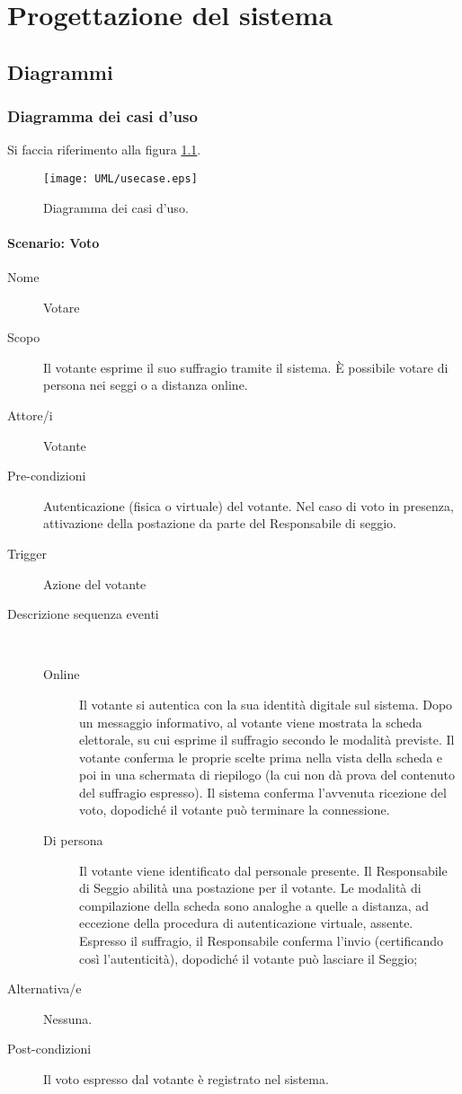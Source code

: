 \chapter{Progettazione del sistema}




\section{Diagrammi}\label{diagrammi}


\subsection{Diagramma dei casi d'uso}
Si faccia riferimento alla figura \ref{fig:usecasediag}.
\begin{figure}[ht]
	\centering
	\texttt{[image: UML/usecase.eps]}
	\caption{Diagramma dei casi d'uso.}
	\label{fig:usecasediag}
\end{figure}


\subsubsection{Scenario: Voto}
\begin{description}
	\item[Nome] Votare
	\item[Scopo] Il votante esprime il suo suffragio tramite il sistema. È possibile votare di persona nei seggi o a distanza online.
	\item[Attore/i] Votante
	\item[Pre-condizioni] Autenticazione (fisica o virtuale) del votante. Nel caso di voto in presenza, attivazione della postazione da parte del Responsabile di seggio.
	\item[Trigger] Azione del votante
	\item[Descrizione sequenza eventi] ~
		\begin{description}
			\item[Online] Il votante si autentica con la sua identità digitale sul sistema. Dopo un messaggio informativo, al votante viene mostrata la scheda elettorale, su cui esprime il suffragio secondo le modalità previste. Il votante conferma le proprie scelte prima nella vista della scheda e poi in una schermata di riepilogo (la cui non dà prova del contenuto del suffragio espresso). Il sistema conferma l'avvenuta ricezione del voto, dopodiché il votante può terminare la connessione.
			\item[Di persona] Il votante viene identificato dal personale presente. Il Responsabile di Seggio abilità una postazione per il votante. Le modalità di compilazione della scheda sono analoghe a quelle a distanza, ad eccezione della procedura di autenticazione virtuale, assente. Espresso il suffragio, il Responsabile conferma l'invio (certificando così l'autenticità), dopodiché il votante può lasciare il Seggio;
		\end{description}
	\item[Alternativa/e] Nessuna.
	\item[Post-condizioni] Il voto espresso dal votante è registrato nel sistema.
\end{description}


